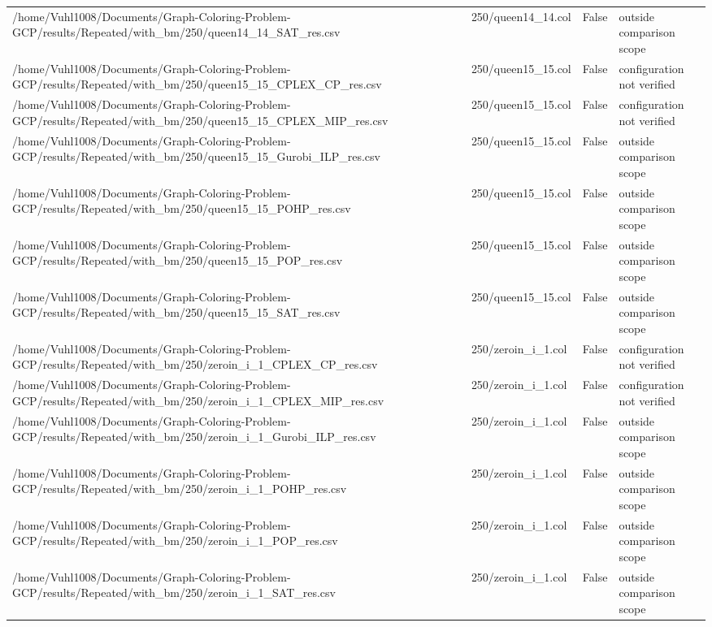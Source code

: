 \begin{table}[htbp]
\begin{tabular}{llll}
/home/Vuhl1008/Documents/Graph-Coloring-Problem-GCP/results/Repeated/with\_bm/250/queen14\_14\_SAT\_res.csv & 250/queen14\_14.col & False & outside comparison scope \\
/home/Vuhl1008/Documents/Graph-Coloring-Problem-GCP/results/Repeated/with\_bm/250/queen15\_15\_CPLEX\_CP\_res.csv & 250/queen15\_15.col & False & configuration not verified \\
/home/Vuhl1008/Documents/Graph-Coloring-Problem-GCP/results/Repeated/with\_bm/250/queen15\_15\_CPLEX\_MIP\_res.csv & 250/queen15\_15.col & False & configuration not verified \\
/home/Vuhl1008/Documents/Graph-Coloring-Problem-GCP/results/Repeated/with\_bm/250/queen15\_15\_Gurobi\_ILP\_res.csv & 250/queen15\_15.col & False & outside comparison scope \\
/home/Vuhl1008/Documents/Graph-Coloring-Problem-GCP/results/Repeated/with\_bm/250/queen15\_15\_POHP\_res.csv & 250/queen15\_15.col & False & outside comparison scope \\
/home/Vuhl1008/Documents/Graph-Coloring-Problem-GCP/results/Repeated/with\_bm/250/queen15\_15\_POP\_res.csv & 250/queen15\_15.col & False & outside comparison scope \\
/home/Vuhl1008/Documents/Graph-Coloring-Problem-GCP/results/Repeated/with\_bm/250/queen15\_15\_SAT\_res.csv & 250/queen15\_15.col & False & outside comparison scope \\
/home/Vuhl1008/Documents/Graph-Coloring-Problem-GCP/results/Repeated/with\_bm/250/zeroin\_i\_1\_CPLEX\_CP\_res.csv & 250/zeroin\_i\_1.col & False & configuration not verified \\
/home/Vuhl1008/Documents/Graph-Coloring-Problem-GCP/results/Repeated/with\_bm/250/zeroin\_i\_1\_CPLEX\_MIP\_res.csv & 250/zeroin\_i\_1.col & False & configuration not verified \\
/home/Vuhl1008/Documents/Graph-Coloring-Problem-GCP/results/Repeated/with\_bm/250/zeroin\_i\_1\_Gurobi\_ILP\_res.csv & 250/zeroin\_i\_1.col & False & outside comparison scope \\
/home/Vuhl1008/Documents/Graph-Coloring-Problem-GCP/results/Repeated/with\_bm/250/zeroin\_i\_1\_POHP\_res.csv & 250/zeroin\_i\_1.col & False & outside comparison scope \\
/home/Vuhl1008/Documents/Graph-Coloring-Problem-GCP/results/Repeated/with\_bm/250/zeroin\_i\_1\_POP\_res.csv & 250/zeroin\_i\_1.col & False & outside comparison scope \\
/home/Vuhl1008/Documents/Graph-Coloring-Problem-GCP/results/Repeated/with\_bm/250/zeroin\_i\_1\_SAT\_res.csv & 250/zeroin\_i\_1.col & False & outside comparison scope \\

\end{tabular}
\end{table}
